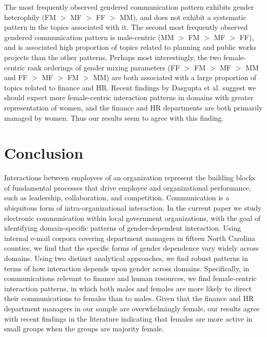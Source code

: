 \documentclass{pnastwo}
\begin{document}
\begin{article}
The most frequently observed gendered communication pattern exhibits gender heterophily (FM $>$  MF $>$ FF $>$ MM), and does not exhibit a systematic pattern in the topics associated with it. The second most frequently observed gendered communication pattern is male-centric (MM $>$ FM $>$ MF $>$ FF), and is associated high proportion of topics related to planning and public works projects than the other patterns. Perhaps most interestingly, the two female-centric rank orderings of gender mixing parameters (FF $>$ FM $>$ MF $>$ MM and FF $>$ MF $>$ FM $>$ MM) are both associated with a large proportion of topics related to finance and HR. Recent findings by Dasgupta et al. \cite{Dasgupta2015} suggest we should expect more female-centric interaction patterns in domains with greater representation of women, and the finance and HR departments are both primarily managed by women. Thus our results seem to agree with this finding.

\section{Conclusion}

Interactions between employees of an organization represent the building blocks of fundamental processes that drive employee and organizational performance, such as leadership, collaboration, and competition. Communication is a ubiquitous form of intra-organizational interaction. In the current paper we study electronic communication within local government organizations, with the goal of identifying domain-specific patterns of gender-dependent interaction. Using internal e-mail corpora covering department managers in fifteen North Carolina counties, we find that the specific forms of gender dependence vary widely across domains. Using two distinct analytical approaches, we find robust patterns in terms of how interaction depends upon gender across domains. Specifically, in communications relevant to finance and human resources, we find female-centric interaction patterns, in which both males and females are more likely to direct their communications to females than to males. Given that the finance and HR department managers in our sample are overwhelmingly female, our results agree with recent findings in the literature indicating that females are more active in small groups when the groups are majority female. 



\end{article}
\end{document}

